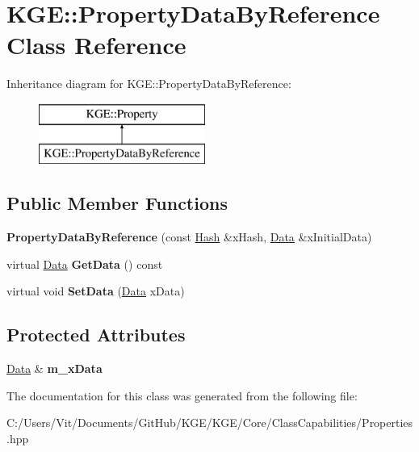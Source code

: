 \hypertarget{class_k_g_e_1_1_property_data_by_reference}{\section{K\-G\-E\-:\-:Property\-Data\-By\-Reference Class Reference}
\label{class_k_g_e_1_1_property_data_by_reference}
}
Inheritance diagram for K\-G\-E\-:\-:Property\-Data\-By\-Reference\-:\begin{figure}[H]
\begin{center}
\leavevmode
\includegraphics[height=2.000000cm]{class_k_g_e_1_1_property_data_by_reference}
\end{center}
\end{figure}
\subsection*{Public Member Functions}
\begin{DoxyCompactItemize}
\item 
\hypertarget{class_k_g_e_1_1_property_data_by_reference_af3df23a6fa9f76415da5786f82033ba7}{{\bfseries Property\-Data\-By\-Reference} (const \hyperlink{class_k_g_e_1_1_hash}{Hash} \&x\-Hash, \hyperlink{class_k_g_e_1_1_data}{Data} \&x\-Initial\-Data)}\label{class_k_g_e_1_1_property_data_by_reference_af3df23a6fa9f76415da5786f82033ba7}

\item 
\hypertarget{class_k_g_e_1_1_property_data_by_reference_affcbd041e32d676fcd062fb2e0556e7f}{virtual \hyperlink{class_k_g_e_1_1_data}{Data} {\bfseries Get\-Data} () const }\label{class_k_g_e_1_1_property_data_by_reference_affcbd041e32d676fcd062fb2e0556e7f}

\item 
\hypertarget{class_k_g_e_1_1_property_data_by_reference_aa06f1593adb338cd08bff28f9d8f3b6a}{virtual void {\bfseries Set\-Data} (\hyperlink{class_k_g_e_1_1_data}{Data} x\-Data)}\label{class_k_g_e_1_1_property_data_by_reference_aa06f1593adb338cd08bff28f9d8f3b6a}

\end{DoxyCompactItemize}
\subsection*{Protected Attributes}
\begin{DoxyCompactItemize}
\item 
\hypertarget{class_k_g_e_1_1_property_data_by_reference_a4f477343216bfd2de7272a51814d8ba6}{\hyperlink{class_k_g_e_1_1_data}{Data} \& {\bfseries m\-\_\-x\-Data}}\label{class_k_g_e_1_1_property_data_by_reference_a4f477343216bfd2de7272a51814d8ba6}

\end{DoxyCompactItemize}


The documentation for this class was generated from the following file\-:\begin{DoxyCompactItemize}
\item 
C\-:/\-Users/\-Vit/\-Documents/\-Git\-Hub/\-K\-G\-E/\-K\-G\-E/\-Core/\-Class\-Capabilities/Properties.\-hpp\end{DoxyCompactItemize}
